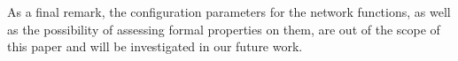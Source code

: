 As a final remark, the configuration parameters for the network functions, as well as the possibility of assessing formal properties on them, are out of the scope of this paper and will be investigated in our future work.

